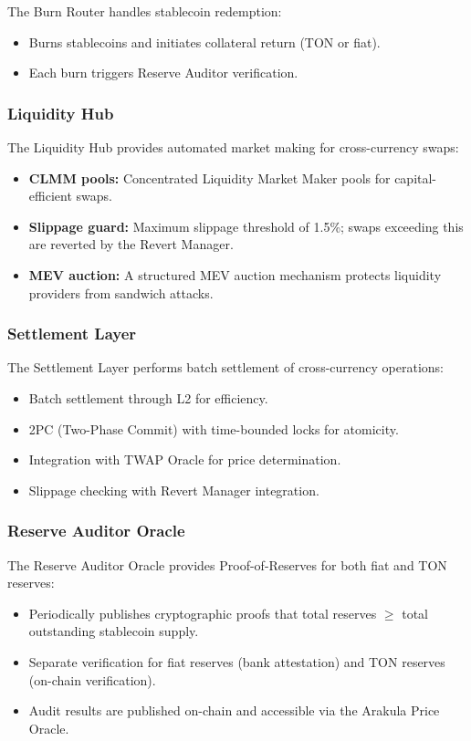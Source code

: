 \documentclass[12pt,a4paper]{article}
\theoremstyle{definition}
\theoremstyle{remark}
\begin{document}
The Burn Router handles stablecoin redemption:
\begin{itemize}[nosep]
    \item Burns stablecoins and initiates collateral return (TON or fiat).
    \item Each burn triggers Reserve Auditor verification.
\end{itemize}

\subsubsection{Liquidity Hub}

The Liquidity Hub provides automated market making for cross-currency swaps:
\begin{itemize}[nosep]
    \item \textbf{CLMM pools:} Concentrated Liquidity Market Maker pools for capital-efficient swaps.
    \item \textbf{Slippage guard:} Maximum slippage threshold of 1.5\%; swaps exceeding this are reverted by the Revert Manager.
    \item \textbf{MEV auction:} A structured MEV auction mechanism protects liquidity providers from sandwich attacks.
\end{itemize}

\subsubsection{Settlement Layer}
\label{sec:settlement-layer-arch}

The Settlement Layer performs batch settlement of cross-currency operations:
\begin{itemize}[nosep]
    \item Batch settlement through L2 for efficiency.
    \item 2PC (Two-Phase Commit) with time-bounded locks for atomicity.
    \item Integration with TWAP Oracle for price determination.
    \item Slippage checking with Revert Manager integration.
\end{itemize}

\subsubsection{Reserve Auditor Oracle}

The Reserve Auditor Oracle provides Proof-of-Reserves for both fiat and TON reserves:
\begin{itemize}[nosep]
    \item Periodically publishes cryptographic proofs that total reserves $\geq$ total outstanding stablecoin supply.
    \item Separate verification for fiat reserves (bank attestation) and TON reserves (on-chain verification).
    \item Audit results are published on-chain and accessible via the Arakula Price Oracle.
\end{itemize}
\end{document}
